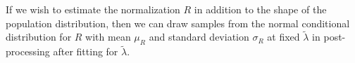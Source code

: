 \documentclass[modern]{aastex62}
\begin{document}
If we wish to estimate the normalization $R$ in addition to the shape of the
population distribution, then we can draw samples from the normal conditional
distribution for $R$ with mean $\mu_R$ and standard deviation $\sigma_R$ at
fixed $\tilde{\lambda}$ in post-processing after fitting for $\tilde{\lambda}$.


\end{document}
